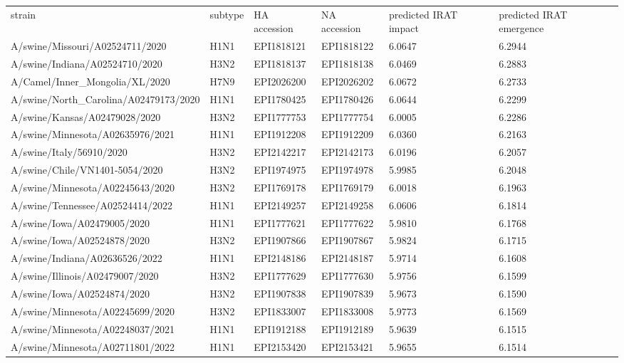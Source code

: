 \begin{tabular}{L{1.95in}|L{.25in}|L{.60in}|L{.6in}|C{1in}|C{1in}}\hline
strain&subtype& HA  accession & NA  accession & predicted  IRAT  impact & predicted  IRAT  emergence \\
 A/swine/Missouri/A02524711/2020 &H1N1&EPI1818121&EPI1818122&6.0647&6.2944\\
 A/swine/Indiana/A02524710/2020 &H3N2&EPI1818137&EPI1818138&6.0469&6.2883\\
 A/Camel/Inner\_Mongolia/XL/2020 &H7N9&EPI2026200&EPI2026202&6.0672&6.2733\\
 A/swine/North\_Carolina/A02479173/2020 &H1N1&EPI1780425&EPI1780426&6.0644&6.2299\\
 A/swine/Kansas/A02479028/2020 &H3N2&EPI1777753&EPI1777754&6.0005&6.2286\\
 A/swine/Minnesota/A02635976/2021 &H1N1&EPI1912208&EPI1912209&6.0360&6.2163\\
 A/swine/Italy/56910/2020 &H3N2&EPI2142217&EPI2142173&6.0196&6.2057\\
 A/swine/Chile/VN1401-5054/2020 &H3N2&EPI1974975&EPI1974978&5.9985&6.2048\\
 A/swine/Minnesota/A02245643/2020 &H3N2&EPI1769178&EPI1769179&6.0018&6.1963\\
 A/swine/Tennessee/A02524414/2022 &H1N1&EPI2149257&EPI2149258&6.0606&6.1814\\
 A/swine/Iowa/A02479005/2020 &H1N1&EPI1777621&EPI1777622&5.9810&6.1768\\
 A/swine/Iowa/A02524878/2020 &H3N2&EPI1907866&EPI1907867&5.9824&6.1715\\
 A/swine/Indiana/A02636526/2022 &H1N1&EPI2148186&EPI2148187&5.9714&6.1608\\
 A/swine/Illinois/A02479007/2020 &H3N2&EPI1777629&EPI1777630&5.9756&6.1599\\
 A/swine/Iowa/A02524874/2020 &H3N2&EPI1907838&EPI1907839&5.9673&6.1590\\
 A/swine/Minnesota/A02245699/2020 &H3N2&EPI1833007&EPI1833008&5.9773&6.1569\\
 A/swine/Minnesota/A02248037/2021 &H1N1&EPI1912188&EPI1912189&5.9639&6.1515\\
 A/swine/Minnesota/A02711801/2022 &H1N1&EPI2153420&EPI2153421&5.9655&6.1514\\

\end{tabular}

